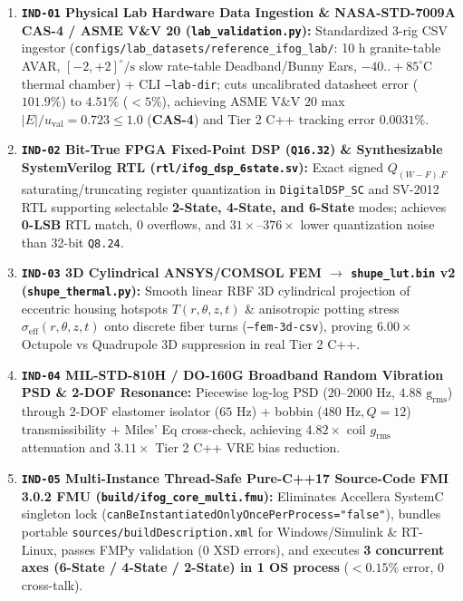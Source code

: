 \documentclass[11pt,a4paper]{article}
\begin{document}
\begin{enumerate}
    \item \textbf{\texttt{IND-01} Physical Lab Hardware Data Ingestion \& NASA-STD-7009A CAS-4 / ASME V\&V 20 (\texttt{lab\_validation.py}):}
    Standardized 3-rig CSV ingestor (\texttt{configs/lab\_datasets/reference\_ifog\_lab/}: 10 h granite-table AVAR, $[-2,+2]^\circ/\text{s}$ slow rate-table Deadband/Bunny Ears, $-40..+85^\circ\text{C}$ thermal chamber) + CLI \texttt{--lab-dir}; cuts uncalibrated datasheet error ($101.9\%$) to \textbf{$4.51\%$} ($<5\%$), achieving ASME V\&V 20 max $|E|/u_{\text{val}} = 0.723 \le 1.0$ (\textbf{CAS-4}) and Tier 2 C++ tracking error $0.0031\%$.
    \item \textbf{\texttt{IND-02} Bit-True FPGA Fixed-Point DSP (\texttt{Q16.32}) \& Synthesizable SystemVerilog RTL (\texttt{rtl/ifog\_dsp\_6state.sv}):}
    Exact signed $Q_{(W-F).F}$ saturating/truncating register quantization in \texttt{DigitalDSP\_SC} and SV-2012 RTL supporting selectable \textbf{2-State, 4-State, and 6-State} modes; achieves \textbf{0-LSB} RTL match, 0 overflows, and $31\times$--$376\times$ lower quantization noise than 32-bit \texttt{Q8.24}.
    \item \textbf{\texttt{IND-03} 3D Cylindrical ANSYS/COMSOL FEM $\to$ \texttt{shupe\_lut.bin} v2 (\texttt{shupe\_thermal.py}):}
    Smooth linear RBF 3D cylindrical projection of eccentric housing hotspots $T(r,\theta,z,t)$ \& anisotropic potting stress $\sigma_{\text{eff}}(r,\theta,z,t)$ onto discrete fiber turns (\texttt{--fem-3d-csv}), proving \textbf{$6.00\times$} Octupole vs Quadrupole 3D suppression in real Tier 2 C++.
    \item \textbf{\texttt{IND-04} MIL-STD-810H / DO-160G Broadband Random Vibration PSD \& 2-DOF Resonance:}
    Piecewise log-log PSD ($20$--$2000\text{ Hz}$, $4.88\text{ g}_{\text{rms}}$) through 2-DOF elastomer isolator ($65\text{ Hz}$) + bobbin ($480\text{ Hz}, Q=12$) transmissibility + Miles' Eq cross-check, achieving \textbf{$4.82\times$} coil $g_{\text{rms}}$ attenuation and \textbf{$3.11\times$} Tier 2 C++ VRE bias reduction.
    \item \textbf{\texttt{IND-05} Multi-Instance Thread-Safe Pure-C++17 Source-Code FMI 3.0.2 FMU (\texttt{build/ifog\_core\_multi.fmu}):}
    Eliminates Accellera SystemC singleton lock (\texttt{canBeInstantiatedOnlyOncePerProcess="false"}), bundles portable \texttt{sources/buildDescription.xml} for Windows/Simulink \& RT-Linux, passes FMPy validation (0 XSD errors), and executes \textbf{3 concurrent axes (6-State / 4-State / 2-State) in 1 OS process} ($<0.15\%$ error, 0 cross-talk).

\end{enumerate}
\end{document}
